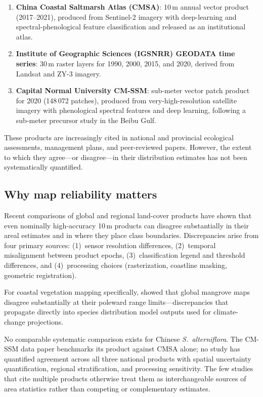 \documentclass[11pt]{article}
\begin{document}
\begin{enumerate}[nosep]
\item \textbf{China Coastal Saltmarsh Atlas (CMSA)}: 10\,m annual vector product
  (2017--2021), produced from Sentinel-2 imagery with deep-learning and
  spectral-phenological feature classification\citep{li_2024_cmsa} and released
  as an institutional atlas\citep{cmsa_2024_release}.
\item \textbf{Institute of Geographic Sciences (IGSNRR) GEODATA time series}:
  30\,m raster layers for 1990, 2000, 2015, and 2020, derived from Landsat and
  ZY-3 imagery\citep{geodata_time_series}.
\item \textbf{Capital Normal University CM-SSM}: sub-meter vector patch product
  for 2020 (148\,072 patches), produced from very-high-resolution satellite
  imagery with phenological spectral features and deep learning, following a
  sub-meter precursor study in the Beibu Gulf\citep{zhou_2025_cmssm,
  zhou_2024_ijde_beibu}.
\end{enumerate}

These products are increasingly cited in national and provincial ecological
assessments, management plans, and peer-reviewed papers. However, the extent
to which they agree---or disagree---in their distribution estimates has not been
systematically quantified.

\subsection{Why map reliability matters}

Recent comparisons of global and regional land-cover products
\citep{wang_2024_ijde, zhao_2023_rs, xu_2024_rse, ding_2022_rs} have shown that
even nominally high-accuracy 10\,m products can disagree substantially in
their areal estimates and in where they place class boundaries. Discrepancies
arise from four primary sources:
(1)~sensor resolution differences, (2)~temporal misalignment between product
epochs, (3)~classification legend and threshold differences, and
(4)~processing choices (rasterization, coastline masking, geometric
registration).

For coastal vegetation mapping specifically, \citet{ximenes_2023_stoten}
showed that global mangrove maps disagree substantially at their poleward
range limits---discrepancies that propagate directly
into species distribution model outputs used for climate-change projections.

No comparable systematic comparison exists for Chinese \textit{S.~alterniflora}.
The CM-SSM data paper benchmarks its product against CMSA
alone\citep{zhou_2025_cmssm}; no study has quantified agreement across all
three national products with spatial uncertainty quantification, regional
stratification, and processing sensitivity. The few studies that cite multiple
products otherwise treat them as interchangeable sources
of area statistics rather than competing or complementary estimates.
\end{document}
